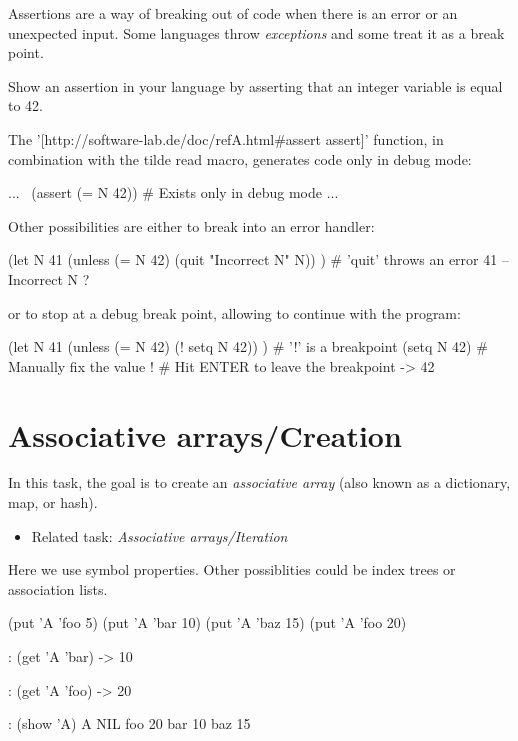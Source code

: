 Assertions are a way of breaking out of code when there is an error or
an unexpected input. Some languages throw \emph{exceptions} and some
treat it as a break point.

Show an assertion in your language by asserting that an integer variable
is equal to 42.

\begin{wideverbatim}

The '[http://software-lab.de/doc/refA.html#assert assert]' function, in
combination with the tilde read macro, generates code only in debug mode:

...
~(assert (= N 42))  # Exists only in debug mode
...

Other possibilities are either to break into an error handler:

(let N 41
   (unless (= N 42) (quit "Incorrect N" N)) )  # 'quit' throws an error
41 -- Incorrect N
?

or to stop at a debug break point, allowing to continue with the program:

(let N 41
   (unless (= N 42) (! setq N 42)) )   # '!' is a breakpoint
(setq N 42)                            # Manually fix the value
!                                      # Hit ENTER to leave the breakpoint
-> 42

\end{wideverbatim}

\pagebreak{}
\section*{Associative arrays/Creation}

In this task, the goal is to create an \emph{associative array} (also
known as a dictionary, map, or hash).

\begin{itemize}
\item
  Related task: \emph{Associative arrays/Iteration}
\end{itemize}


\begin{wideverbatim}

Here we use symbol properties. Other possiblities could be index
trees or association lists.

(put 'A 'foo 5)
(put 'A 'bar 10)
(put 'A 'baz 15)
(put 'A 'foo 20)

: (get 'A 'bar)
-> 10

: (get 'A 'foo)
-> 20

: (show 'A)
A NIL
   foo 20
   bar 10
   baz 15

\end{wideverbatim}

